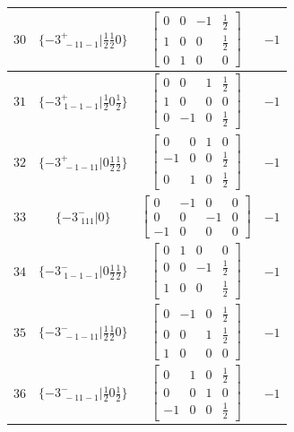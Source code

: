 \documentclass[fleqn,8pt]{jsarticle}
\begin{document}
\begin{longtable}{cccc}
$ 30 $ & $ \{-3^{+}_{\,\,-11-1}|\frac{1}{2} \frac{1}{2} 0\} $ & $ \begin{bmatrix} 0 & 0 & -1 & \frac{1}{2} \\ 1 & 0 & 0 & \frac{1}{2} \\ 0 & 1 & 0 & 0 \end{bmatrix} $ & $ -1 $ \\ \hline
$ 31 $ & $ \{-3^{+}_{\,\,1-1-1}|\frac{1}{2} 0 \frac{1}{2}\} $ & $ \begin{bmatrix} 0 & 0 & 1 & \frac{1}{2} \\ 1 & 0 & 0 & 0 \\ 0 & -1 & 0 & \frac{1}{2} \end{bmatrix} $ & $ -1 $ \\ \hline
$ 32 $ & $ \{-3^{+}_{\,\,-1-11}|0 \frac{1}{2} \frac{1}{2}\} $ & $ \begin{bmatrix} 0 & 0 & 1 & 0 \\ -1 & 0 & 0 & \frac{1}{2} \\ 0 & 1 & 0 & \frac{1}{2} \end{bmatrix} $ & $ -1 $ \\ \hline
$ 33 $ & $ \{-3^{-}_{\,\,111}|0\} $ & $ \begin{bmatrix} 0 & -1 & 0 & 0 \\ 0 & 0 & -1 & 0 \\ -1 & 0 & 0 & 0 \end{bmatrix} $ & $ -1 $ \\ \hline
$ 34 $ & $ \{-3^{-}_{\,\,1-1-1}|0 \frac{1}{2} \frac{1}{2}\} $ & $ \begin{bmatrix} 0 & 1 & 0 & 0 \\ 0 & 0 & -1 & \frac{1}{2} \\ 1 & 0 & 0 & \frac{1}{2} \end{bmatrix} $ & $ -1 $ \\ \hline
$ 35 $ & $ \{-3^{-}_{\,\,-1-11}|\frac{1}{2} \frac{1}{2} 0\} $ & $ \begin{bmatrix} 0 & -1 & 0 & \frac{1}{2} \\ 0 & 0 & 1 & \frac{1}{2} \\ 1 & 0 & 0 & 0 \end{bmatrix} $ & $ -1 $ \\ \hline
$ 36 $ & $ \{-3^{-}_{\,\,-11-1}|\frac{1}{2} 0 \frac{1}{2}\} $ & $ \begin{bmatrix} 0 & 1 & 0 & \frac{1}{2} \\ 0 & 0 & 1 & 0 \\ -1 & 0 & 0 & \frac{1}{2} \end{bmatrix} $ & $ -1 $ \\ \hline

\end{longtable}
\end{document}
